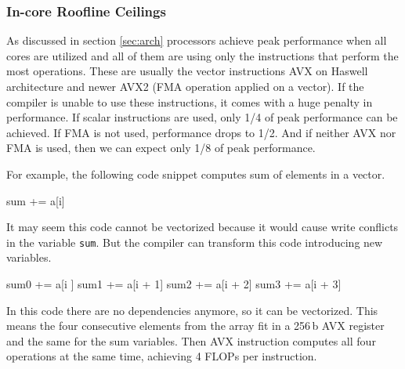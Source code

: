 \subsubsection*{In-core Roofline Ceilings}


As discussed in section \ref{sec:arch} processors achieve peak performance when all cores are utilized and all of them are using only the instructions that perform the most operations. These are usually the vector instructions AVX on Haswell architecture and newer AVX2 (FMA operation applied on a vector).
If the compiler is unable to use these instructions, it comes with a huge penalty in performance. If scalar instructions are used, only 1/4 of peak performance can be achieved. If FMA is not used, performance drops to 1/2. And if neither AVX nor FMA is used, then we can expect only 1/8 of peak performance.


For example, the following code snippet computes sum of elements in a vector.
\begin{algorithmic}[1]
      \State sum += a[i]
  \EndFor
\end{algorithmic}%
It may seem this code cannot be vectorized because it would cause write conflicts in the variable \texttt{sum}.
But the compiler can transform this code introducing new variables.
\begin{algorithmic}[1]
      \State sum0 += a[i    ]
      \State sum1 += a[i + 1]
      \State sum2 += a[i + 2]
      \State sum3 += a[i + 3]
  \EndFor
\end{algorithmic}%
In this code there are no dependencies anymore, so it can be vectorized.
This means the four consecutive elements from the array fit in a 256\,b AVX register and the same for the sum variables. Then AVX instruction computes all four operations at the same time, achieving 4 FLOPs per instruction.

